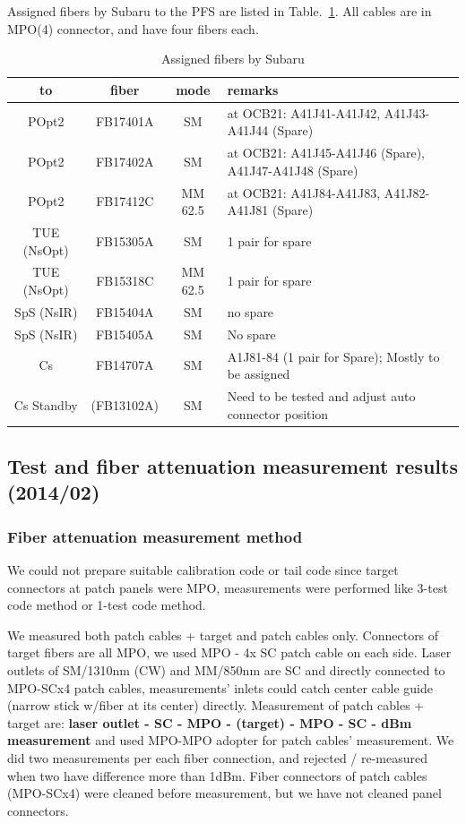 \documentclass[a4paper,notitlepage]{article}
\begin{document}
Assigned fibers by Subaru to the PFS are listed 
in Table.~\ref{tab:subaru-fiber}.
All cables are in MPO(4) connector, and have four fibers each. 

\begin{table}[htb]
\begin{center}
\caption{Assigned fibers by Subaru}
\label{tab:subaru-fiber}
\begin{tabular}{c|c|c|l}
to & fiber & mode & remarks \\
\hline
POpt2 & FB17401A & SM & at OCB21: A41J41-A41J42, A41J43-A41J44 (Spare) \\
POpt2 & FB17402A & SM & at OCB21: A41J45-A41J46 (Spare), A41J47-A41J48 (Spare) \\
POpt2 & FB17412C & MM 62.5 & at OCB21: A41J84-A41J83, A41J82-A41J81 (Spare) \\
\hline
TUE (NsOpt) & FB15305A & SM & 1 pair for spare \\
TUE (NsOpt) & FB15318C & MM 62.5 & 1 pair for spare \\
\hline
SpS (NsIR) & FB15404A & SM & no spare \\
SpS (NsIR) & FB15405A & SM & No spare \\
\hline
Cs & FB14707A & SM & A1J81-84 (1 pair for Spare); Mostly to be assigned \\
Cs Standby & (FB13102A) & SM & Need to be tested and adjust auto connector position
\end{tabular}
\end{center}
\end{table}

\subsection{Test and fiber attenuation measurement results (2014/02)} 

\subsubsection{Fiber attenuation measurement method}

We could not prepare suitable calibration code or tail code since 
target connectors at patch panels were MPO, measurements were performed 
like 3-test code method or 1-test code method. 

We measured both patch cables + target and patch cables only. 
Connectors of target fibers are all MPO, we used MPO - 4x SC patch cable on 
each side. Laser outlets of SM/1310nm (CW) and MM/850nm are SC and directly 
connected to MPO-SCx4 patch cables, 
measurements' inlets could catch center cable guide (narrow stick w/fiber 
at its center) directly.
Measurement of patch cables + target are:
{\bf laser outlet - SC - MPO - (target) - MPO - SC - dBm measurement} 
and used MPO-MPO adopter for patch cables' measurement.
We did two measurements per each fiber connection, and rejected / re-measured 
when two have difference more than 1dBm. 
Fiber connectors of patch cables (MPO-SCx4) were cleaned before measurement, 
but we have not cleaned panel connectors. 
\end{document}

